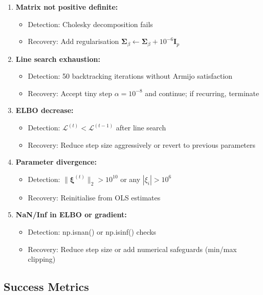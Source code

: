 \documentclass[11pt]{article}
\begin{document}
\begin{enumerate}
\item \textbf{Matrix not positive definite:}
\begin{itemize}
\item Detection: Cholesky decomposition fails
\item Recovery: Add regularisation $\bm{\Sigma}_\beta \leftarrow \bm{\Sigma}_\beta + 10^{-6} \bm{I}_p$
\end{itemize}

\item \textbf{Line search exhaustion:}
\begin{itemize}
\item Detection: 50 backtracking iterations without Armijo satisfaction
\item Recovery: Accept tiny step $\alpha = 10^{-8}$ and continue; if recurring, terminate
\end{itemize}

\item \textbf{ELBO decrease:}
\begin{itemize}
\item Detection: $\mathcal{L}^{(t)} < \mathcal{L}^{(t-1)}$ after line search
\item Recovery: Reduce step size aggressively or revert to previous parameters
\end{itemize}

\item \textbf{Parameter divergence:}
\begin{itemize}
\item Detection: $\|\bm{\xi}^{(t)}\|_2 > 10^{10}$ or any $|\xi_i| > 10^{6}$
\item Recovery: Reinitialise from OLS estimates
\end{itemize}

\item \textbf{NaN/Inf in ELBO or gradient:}
\begin{itemize}
\item Detection: np.isnan() or np.isinf() checks
\item Recovery: Reduce step size or add numerical safeguards (min/max clipping)
\end{itemize}
\end{enumerate}

\newpage
\subsection*{Success Metrics}
\end{document}

